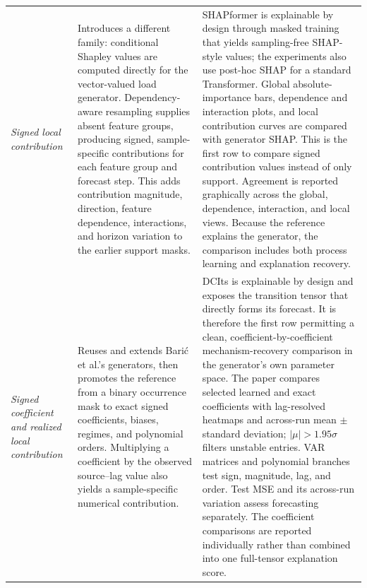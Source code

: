 \begin{longtable}{@{}
>{\raggedright\arraybackslash}p{}
>{\raggedright\arraybackslash}p{}
>{\raggedright\arraybackslash}p{}@{}}
\emph{Signed local contribution} &
Introduces a different family: conditional Shapley values are computed directly
for the vector-valued load generator. Dependency-aware resampling supplies
absent feature groups, producing signed, sample-specific contributions for each
feature group and forecast step. This adds contribution magnitude, direction,
feature dependence, interactions, and horizon variation to the earlier support
masks. &
SHAPformer is explainable by design through masked training that yields
sampling-free SHAP-style values; the experiments also use post-hoc SHAP for a
standard Transformer. Global absolute-importance bars, dependence and
interaction plots, and local contribution curves are compared with generator
SHAP. This is the first row to compare signed contribution values instead of
only support. Agreement is reported graphically across the global, dependence,
interaction, and local views. Because the reference explains the generator, the
comparison includes both process learning and explanation recovery. \\
\addlinespace

\citet{baric2026dcits}

\emph{Signed coefficient and realized local contribution} &
Reuses and extends Bari\'c et al.'s generators, then promotes the reference from
a binary occurrence mask to exact signed coefficients, biases, regimes, and
polynomial orders. Multiplying a coefficient by the observed source--lag value
also yields a sample-specific numerical contribution. &
DCIts is explainable by design and exposes the transition tensor that directly
forms its forecast. It is therefore the first row permitting a clean,
coefficient-by-coefficient mechanism-recovery comparison in the generator's own
parameter space. The paper compares selected learned and exact coefficients
with lag-resolved heatmaps and across-run mean $\pm$ standard deviation;
$|\mu|>1.95\sigma$ filters unstable entries. VAR matrices and polynomial
branches test sign, magnitude, lag, and order. Test MSE and its across-run
variation assess forecasting separately. The coefficient comparisons are
reported individually rather than combined into one full-tensor explanation
score. \\

\end{longtable}
\endgroup

